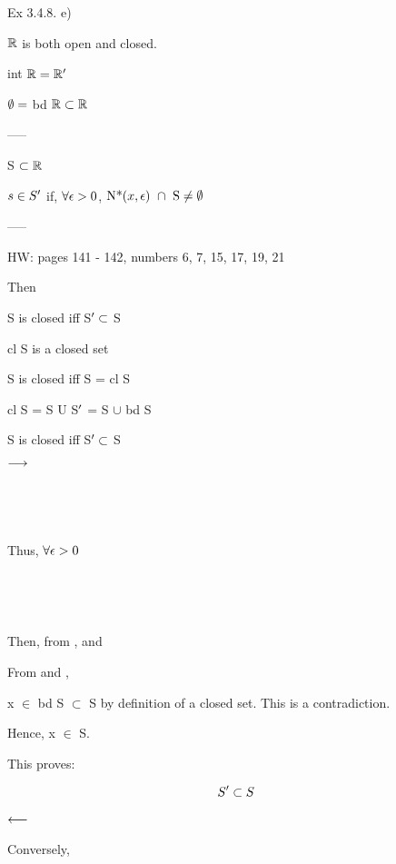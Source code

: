 \documentclass{article}
\begin{document}

Ex 3.4.8. e) \ 

$\mathbb{R}$ is both open and closed.

int $\mathbb{R} = \mathbb{R}^\prime$

$\emptyset =$ bd $\mathbb{R} \subset \mathbb{R}$

-----

S $\subset \mathbb{R}$ \par
$s \in S^\prime$ if, $\forall \epsilon > 0$, $\textrm{N*(}x, \epsilon\textrm{) }\cap \textrm{ S} \neq \emptyset$

-----

HW: pages 141 - 142, numbers 6, 7, 15, 17, 19, 21



Then

\balist
\item S is closed iff S$^\prime \subset$ S
\item cl S is a closed set
\item S is closed iff S = cl S
\item cl S = S U S$^\prime$ = S $\cup$ bd S
\elist

\bgpf
{}
S is closed iff S$^\prime \subset$ S \

$\longrightarrow$


 \

 \
 
Thus, $\forall \epsilon > 0$ 


 \

 \

Then, from ,
and

From  and , \

x $\in$ bd S $\subset$ S by definition of a closed set. This is a contradiction. \

Hence, x $\in$ S.

This proves:
 
\[S^\prime \subset S\]

$\longleftarrow$ \

Conversely, \


 \



\end{document}

